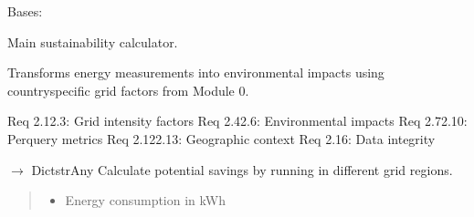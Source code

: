 \documentclass[letterpaper,10pt,english]{sphinxmanual}
\begin{document}
\begin{fulllineitems}
\label{\detokenize{core.sustainability.calculator:core.sustainability.calculator.SustainabilityCalculator}}
\pysigstartsignatures
\pysiglinewithargsret
{}
{}
{}
\pysigstopsignatures
\sphinxAtStartPar
Bases: 

\sphinxAtStartPar
Main sustainability calculator.

\sphinxAtStartPar
Transforms energy measurements into environmental impacts using
country\sphinxhyphen{}specific grid factors from Module 0.
\begin{description}
\sphinxAtStartPar
Req 2.1\sphinxhyphen{}2.3: Grid intensity factors
Req 2.4\sphinxhyphen{}2.6: Environmental impacts
Req 2.7\sphinxhyphen{}2.10: Per\sphinxhyphen{}query metrics
Req 2.12\sphinxhyphen{}2.13: Geographic context
Req 2.16: Data integrity

\end{description}

\begin{fulllineitems}
\label{\detokenize{core.sustainability.calculator:core.sustainability.calculator.SustainabilityCalculator.calculate_arbitrage}}
\pysigstartsignatures
\pysiglinewithargsret
{}
{\sphinxparamcomma {}}
{{ $\rightarrow$ Dict\DUrole{p}{{[}}strAny\DUrole{p}{{]}}}}
\pysigstopsignatures
\sphinxAtStartPar
Calculate potential savings by running in different grid regions.
\begin{quote}\begin{description}
\begin{itemize}
\item {} 
\sphinxAtStartPar
{} \textendash{} Energy consumption in kWh


\end{itemize}
\end{description}
\end{quote}
\end{fulllineitems}
\end{fulllineitems}
\end{document}
